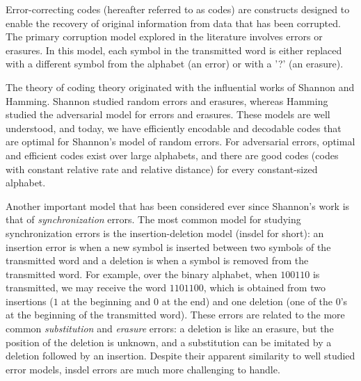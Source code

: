 \documentclass[11pt]{article}
\theoremstyle{plain}
\theoremstyle{definition}
\theoremstyle{remark}
\begin{document}
Error-correcting codes (hereafter referred to as codes) are constructs designed to enable the recovery of original information from data that has been corrupted. 
The primary corruption model explored in the literature involves errors or erasures. In this model, each symbol in the transmitted word is either replaced with a different symbol from the alphabet (an error) or with a '?' (an erasure).

The theory of coding theory originated with the influential works of Shannon and Hamming. Shannon \cite{shannon1948mathematical} studied random errors and erasures, whereas Hamming \cite{hamming1950error} studied the adversarial model for errors and erasures. 
These models are well understood, and today, we have efficiently encodable and decodable codes that are optimal for Shannon's model of random errors. For adversarial errors, optimal and efficient codes exist over large alphabets, and there are good codes (codes with constant relative rate and relative distance) for every constant-sized alphabet.

Another important model that has been considered ever since Shannon's work is that of \emph{synchronization} errors. The most common model for studying synchronization errors is the insertion-deletion model (insdel for short): an insertion error is when a new symbol is inserted between two symbols of the transmitted word and a deletion is when a symbol is removed from the transmitted word. For example, over the binary alphabet, when $100110$ is transmitted, we may receive the word $1101100$, which is obtained from two insertions ($1$ at the beginning and $0$ at the end) and one deletion (one of the $0$'s at the beginning of the transmitted word). These errors are related to the more common \emph{substitution} and \emph{erasure} errors: a deletion is like an erasure, but the position of the deletion is unknown, and a substitution can be imitated by a deletion followed by an insertion. 
Despite their apparent similarity to well studied error models, insdel errors are much more challenging to handle.
\end{document}
